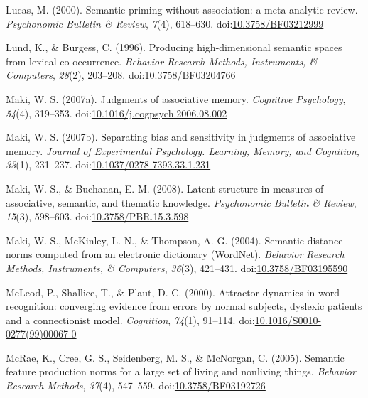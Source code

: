 \documentclass[english,man]{apa6}
\theoremstyle{definition}
\theoremstyle{definition}
\theoremstyle{definition}
\theoremstyle{remark}
\begin{document}
\hypertarget{ref-Lucas2000}{}
Lucas, M. (2000). Semantic priming without association: a meta-analytic
review. \emph{Psychonomic Bulletin \& Review}, \emph{7}(4), 618--630.
doi:\href{https://doi.org/10.3758/BF03212999}{10.3758/BF03212999}

\hypertarget{ref-Lund1996}{}
Lund, K., \& Burgess, C. (1996). Producing high-dimensional semantic
spaces from lexical co-occurrence. \emph{Behavior Research Methods,
Instruments, \& Computers}, \emph{28}(2), 203--208.
doi:\href{https://doi.org/10.3758/BF03204766}{10.3758/BF03204766}

\hypertarget{ref-Maki2007a}{}
Maki, W. S. (2007a). Judgments of associative memory. \emph{Cognitive
Psychology}, \emph{54}(4), 319--353.
doi:\href{https://doi.org/10.1016/j.cogpsych.2006.08.002}{10.1016/j.cogpsych.2006.08.002}

\hypertarget{ref-Maki2007}{}
Maki, W. S. (2007b). Separating bias and sensitivity in judgments of
associative memory. \emph{Journal of Experimental Psychology. Learning,
Memory, and Cognition}, \emph{33}(1), 231--237.
doi:\href{https://doi.org/10.1037/0278-7393.33.1.231}{10.1037/0278-7393.33.1.231}

\hypertarget{ref-Maki2008}{}
Maki, W. S., \& Buchanan, E. M. (2008). Latent structure in measures of
associative, semantic, and thematic knowledge. \emph{Psychonomic
Bulletin \& Review}, \emph{15}(3), 598--603.
doi:\href{https://doi.org/10.3758/PBR.15.3.598}{10.3758/PBR.15.3.598}

\hypertarget{ref-Maki2004}{}
Maki, W. S., McKinley, L. N., \& Thompson, A. G. (2004). Semantic
distance norms computed from an electronic dictionary (WordNet).
\emph{Behavior Research Methods, Instruments, \& Computers},
\emph{36}(3), 421--431.
doi:\href{https://doi.org/10.3758/BF03195590}{10.3758/BF03195590}

\hypertarget{ref-McLeod2000}{}
McLeod, P., Shallice, T., \& Plaut, D. C. (2000). Attractor dynamics in
word recognition: converging evidence from errors by normal subjects,
dyslexic patients and a connectionist model. \emph{Cognition},
\emph{74}(1), 91--114.
doi:\href{https://doi.org/10.1016/S0010-0277(99)00067-0}{10.1016/S0010-0277(99)00067-0}

\hypertarget{ref-McRae2005}{}
McRae, K., Cree, G. S., Seidenberg, M. S., \& McNorgan, C. (2005).
Semantic feature production norms for a large set of living and
nonliving things. \emph{Behavior Research Methods}, \emph{37}(4),
547--559.
doi:\href{https://doi.org/10.3758/BF03192726}{10.3758/BF03192726}
\end{document}
